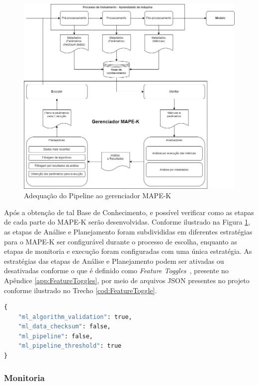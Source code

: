 \documentclass[portugues]{ic-tese}
\begin{document}
\begin{figure}[H]
\centering
\includegraphics[scale=0.5]{images/ML-MAPE-K.jpg}
\caption {Adequação do Pipeline ao gerenciador MAPE-K}
\label{fig:MLMAPEK}
\end{figure}

Após a obtenção de tal Base de Conhecimento, e possível verificar como as etapas de cada parte do MAPE-K serão desenvolvidas. Conforme ilustrado na Figura \ref{fig:MLMAPEK}, as etapas de Análise e Planejamento foram subdivididas em diferentes estratégias para o MAPE-K ser configurável durante o processo de escolha, enquanto as etapas de monitoria e execução foram configuradas com uma única estratégia. As estratégias das etapas de Análise e Planejamento podem ser ativadas ou desativadas conforme o que é definido como \textit{Feature Toggles}~\citep{Rahman_2016}, presente no Apêndice \ref{app:FeatureToggles}, por meio de arquivos JSON presentes no projeto conforme ilustrado no Trecho \ref{cod:FeatureToggle}.

\begin{lstlisting}[language=Python, caption=Exemplo de arquivo utilizando \textbf{(ver termo acima)},label=cod:FeatureToggle]
{
	"ml_algorithm_validation": true,
	"ml_data_checksum": false,
	"ml_pipeline": false,
	"ml_pipeline_threshold": true	
}
\end{lstlisting}

\subsubsection{Monitoria}
\end{document}
